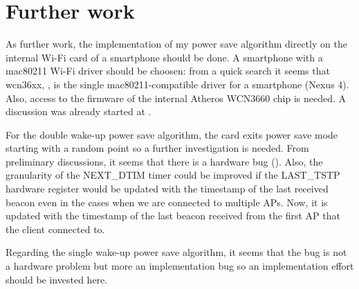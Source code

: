 \section{Further work}
\label{sec:furtherwork}

As further work, the implementation of my power save algorithm directly on the internal Wi-Fi card of a smartphone should be done. A smartphone with a mac80211 Wi-Fi driver should be choosen: from a quick search it seems that wcn36xx, \cite{cite-wcn}, is the single mac80211-compatible driver for a smartphone (Nexus 4). Also, access to the firmware of the internal Atheros WCN3660 chip is needed. A discussion was already started at \cite{cite-wcndiscussion}.

For the double wake-up power save algorithm, the card exits power save mode starting with a random point so a further investigation is needed. From preliminary discussions, it seems that there is a hardware bug (\cite{cite-bugps}). Also, the granularity of the NEXT_DTIM timer could be improved if the LAST_TSTP hardware register would be updated with the timestamp of the last received beacon even in the cases when we are connected to multiple APs. Now, it is updated with the timestamp of the last beacon received from the first AP that the client connected to.

Regarding the single wake-up power save algorithm, it seems that the bug is not a hardware problem but more an implementation bug so an implementation effort should be invested here.
























